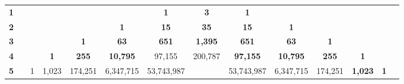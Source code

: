 \begin{table}[h!]
\tiny
\begin{tabular}{llllccccccclll}
{\color[HTML]{FF0000} \textbf{1}} &                       &                           &                                & \multicolumn{1}{l}{} & \multicolumn{1}{l}{}               & \cellcolor[HTML]{FCE5CD}\textbf{1}   & \textbf{3}                             & \textbf{1}                              & \multicolumn{1}{l}{}                    & \multicolumn{1}{l}{}                &                                                       &                                    &                                \\
{\color[HTML]{FF0000} \textbf{2}} &                       &                           &                                & \multicolumn{1}{l}{} & \cellcolor[HTML]{FCE5CD}\textbf{1} & \cellcolor[HTML]{CFE2F3}\textbf{15}  & \cellcolor[HTML]{FCE5CD}\textbf{35}    & \textbf{15}                             & \textbf{1}                              & \multicolumn{1}{l}{}                &                                                       &                                    &                                \\
{\color[HTML]{FF0000} \textbf{3}} &                       &                           &                                & \textbf{1}           & \textbf{63}                        & \cellcolor[HTML]{FCE5CD}\textbf{651} & \cellcolor[HTML]{CFE2F3}\textbf{1,395} & \cellcolor[HTML]{FCE5CD}\textbf{651}    & \textbf{63}                             & \textbf{1}                          &                                                       &                                    &                                \\
{\color[HTML]{FF0000} \textbf{4}} &                       &                           & \multicolumn{1}{c}{\textbf{1}} & \textbf{255}         & \textbf{10,795}                    & 97,155                               & \cellcolor[HTML]{FCE5CD}200,787        & \cellcolor[HTML]{CFE2F3}\textbf{97,155} & \cellcolor[HTML]{FCE5CD}\textbf{10,795} & \textbf{255}                        & \multicolumn{1}{c}{\textbf{1}}                        &                                    &                                \\
{\color[HTML]{FF0000} \textbf{5}} &                       & \multicolumn{1}{c}{1}     & \multicolumn{1}{c}{1,023}      & 174,251              & 6,347,715                          & 53,743,987                           & \multicolumn{1}{l}{}                   & \cellcolor[HTML]{FCE5CD}53,743,987      & \cellcolor[HTML]{CFE2F3}6,347,715       & \cellcolor[HTML]{FCE5CD}174,251     & \multicolumn{1}{c}{\textbf{1,023}}                    & \multicolumn{1}{c}{\textbf{1}}     &                                \\

\end{tabular}
\end{table}
